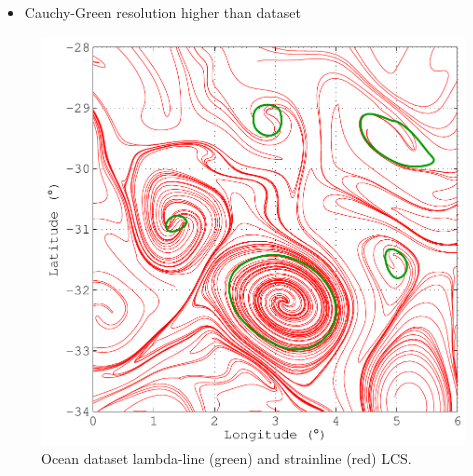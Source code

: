 \documentclass{article}
\begin{document}
\begin{itemize}
\item Cauchy-Green resolution higher than dataset
\end{itemize}

\begin{figure}
\begin{center}
\includegraphics[width=\textwidth]{graphics/ocean_dataset/hyperbolic_shear_lcs_strainline}
\end{center}
\caption{Ocean dataset lambda-line (green) and strainline (red) LCS.}
\label{f:ocean dataset hyperbolic shear lcs strainline}
\end{figure}
\end{document}
